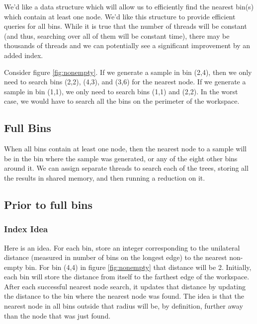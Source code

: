 \begin{figure}[H]
\begin{centering}
    \texttt{[image: \\figfile\{fig/nonempty\_search]}}
    \caption{Non-empty Search}
    \label{fig:nonempty}
\end{centering}
\end{figure}


We'd like a data structure which will allow us to efficiently find the nearest bin(s) which contain at least one node. We'd like this structure to provide efficient queries for all bins. While it is true that the number of threads will be constant (and thus, searching over all of them will be constant time), there may be thousands of threads and we can potentially see a significant improvement by an added index. 

Consider figure \ref{fig:nonempty}. If we generate a sample in bin (2,4), then we only need to search bins (2,2), (4,3), and (3,6) for the nearest node. If we generate a sample in bin (1,1), we only need to search bins (1,1) and (2,2). In the worst case, we would have to search all the bins on the perimeter of the workspace. 

\subsection{Full Bins}

When all bins contain at least one node, then the nearest node to a sample will be in the bin where the sample was generated, or any of the eight other bins around it. We can assign separate threads to search each of the trees, storing all the results in shared memory, and then running a reduction on it. 

\subsection{Prior to full bins}

\subsubsection{Index Idea}

Here is an idea. For each bin, store an integer corresponding to the unilateral distance (measured in number of bins on the longest edge) to the nearest non-empty bin. For bin (4,4) in figure \ref{fig:nonempty} that distance will be 2. Initially, each bin will store the distance from itself to the farthest edge of the workspace. After each successful nearest node search, it updates that distance by updating the distance to the bin where the nearest node was found. The idea is that the nearest node in all bins outside that radius will be, by definition, further away than the node that was just found. 

